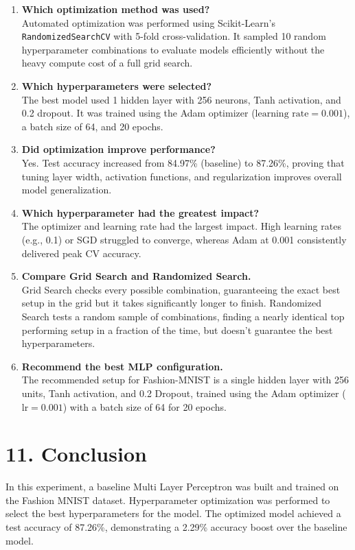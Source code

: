 \documentclass[11pt]{article}
\begin{document}
\begin{enumerate}
    \item \textbf{Which optimization method was used?} \\
    Automated optimization was performed using Scikit-Learn's \texttt{RandomizedSearchCV} with 5-fold cross-validation. It sampled 10 random hyperparameter combinations to evaluate models efficiently without the heavy compute cost of a full grid search.

    \item \textbf{Which hyperparameters were selected?} \\
    The best model used 1 hidden layer with 256 neurons, Tanh activation, and 0.2 dropout. It was trained using the Adam optimizer ($\text{learning rate} = 0.001$), a batch size of 64, and 20 epochs.

    \item \textbf{Did optimization improve performance?} \\
    Yes. Test accuracy increased from 84.97\% (baseline) to 87.26\%, proving that tuning layer width, activation functions, and regularization improves overall model generalization.

    \item \textbf{Which hyperparameter had the greatest impact?} \\
    The optimizer and learning rate had the largest impact. High learning rates (e.g., 0.1) or SGD struggled to converge, whereas Adam at 0.001 consistently delivered peak CV accuracy.

    \item \textbf{Compare Grid Search and Randomized Search.} \\
    Grid Search checks every possible combination, guaranteeing the exact best setup in the grid but it takes significantly longer to finish. Randomized Search tests a random sample of combinations, finding a nearly identical top performing setup in a fraction of the time, but doesn't guarantee the best hyperparameters.

    \item \textbf{Recommend the best MLP configuration.} \\
    The recommended setup for Fashion-MNIST is a single hidden layer with 256 units, Tanh activation, and 0.2 Dropout, trained using the Adam optimizer ($\text{lr} = 0.001$) with a batch size of 64 for 20 epochs.
\end{enumerate}

\section*{11. Conclusion}
In this experiment, a baseline Multi Layer Perceptron was built and trained on the Fashion MNIST dataset. Hyperparameter optimization was performed to select the best hyperparameters for the model. The optimized model achieved a test accuracy of 87.26\%, demonstrating a 2.29\% accuracy boost over the baseline model.
\end{document}
